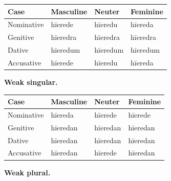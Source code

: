 \par\begingroup
\fontsize{10.5}{13.2}\selectfont
\setlength{\LTleft}{0pt}\setlength{\LTright}{\fill}
\noindent
\begin{tabular}{@{}>{\raggedright\arraybackslash}p{22.0mm}>{\raggedright\arraybackslash}p{31.188mm}>{\raggedright\arraybackslash}p{31.188mm}>{\raggedright\arraybackslash}p{31.188mm}@{}}
\toprule
\textbf{Case} & \textbf{Masculine} & \textbf{Neuter} & \textbf{Feminine} \\
\midrule
Nominative & hīerede & hīeredu & hīereda \\
Genitive & hīeredra & hīeredra & hīeredra \\
Dative & hīeredum & hīeredum & hīeredum \\
Accusative & hīerede & hīeredu & hīereda \\
\bottomrule
\end{tabular}
\par\endgroup
\textbf{Weak singular.}

\par\begingroup
\fontsize{10.5}{13.2}\selectfont
\setlength{\LTleft}{0pt}\setlength{\LTright}{\fill}
\noindent
\begin{tabular}{@{}>{\raggedright\arraybackslash}p{22.0mm}>{\raggedright\arraybackslash}p{31.188mm}>{\raggedright\arraybackslash}p{31.188mm}>{\raggedright\arraybackslash}p{31.188mm}@{}}
\toprule
\textbf{Case} & \textbf{Masculine} & \textbf{Neuter} & \textbf{Feminine} \\
\midrule
Nominative & hīereda & hīerede & hīerede \\
Genitive & hīeredan & hīeredan & hīeredan \\
Dative & hīeredan & hīeredan & hīeredan \\
Accusative & hīeredan & hīerede & hīeredan \\
\bottomrule
\end{tabular}
\par\endgroup
\textbf{Weak plural.}

